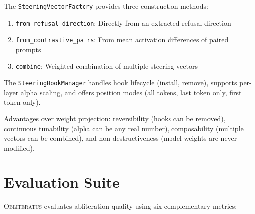 \documentclass[11pt]{article}
\begin{document}
The \texttt{SteeringVectorFactory} provides three construction methods:
\begin{enumerate}
    \item \texttt{from\_refusal\_direction}: Directly from an extracted refusal direction
    \item \texttt{from\_contrastive\_pairs}: From mean activation differences of paired prompts
    \item \texttt{combine}: Weighted combination of multiple steering vectors
\end{enumerate}

The \texttt{SteeringHookManager} handles hook lifecycle (install, remove), supports per-layer alpha scaling, and offers position modes (all tokens, last token only, first token only).

Advantages over weight projection: reversibility (hooks can be removed), continuous tunability (alpha can be any real number), composability (multiple vectors can be combined), and non-destructiveness (model weights are never modified).

\section{Evaluation Suite}
\label{sec:evaluation}

\textsc{Obliteratus} evaluates abliteration quality using six complementary metrics:
\end{document}
